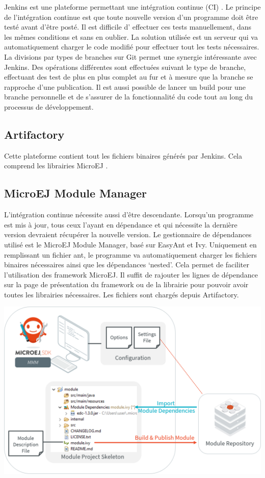 \documentclass[french,a4paper,12pt]{report}
\begin{document}
Jenkins est une plateforme permettant une intégration continue (CI) . Le principe de l’intégration continue est que toute nouvelle version d’un programme doit être testé avant d’être posté. Il est difficile d' effectuer ces tests manuellement, dans les mêmes conditions et sans en oublier. La solution utilisée est un serveur qui va automatiquement charger le code modifié pour effectuer tout les tests nécessaires. La divisions par types de branches sur Git permet une synergie intéressante avec Jenkins. Des opérations différentes sont effectuées suivant le type de branche, effectuant des test de plus en plus complet au fur et à mesure que la branche se rapproche d'une publication. Il est aussi possible de lancer un build pour une branche personnelle et de s’assurer de la fonctionnalité du code tout au long du processus de développement.

\subsection{Artifactory}

Cette plateforme contient tout les fichiers binaires générés par Jenkins. Cela comprend les librairies MicroEJ .

\subsection{MicroEJ Module Manager}
L’intégration continue nécessite aussi d'être descendante. Lorsqu'un programme est mis à jour, tous ceux l'ayant en dépendance et qui nécessite la dernière version devraient récupérer la nouvelle version.
Le gestionnaire de dépendances utilisé est le MicroEJ Module Manager, basé sur EasyAnt et Ivy. Uniquement en remplissant un fichier ant, le programme va automatiquement charger les fichiers binaires nécessaires ainsi que les dépendances ‘nested’. Cela permet de faciliter l’utilisation des framework MicroEJ. Il suffit de rajouter les lignes de dépendance sur la page de présentation du framework ou de la librairie pour pouvoir avoir toutes les librairies nécessaires. Les fichiers sont chargés depuis Artifactory.

\begin{center}
\includegraphics[width=.8\textwidth]{./ressources/schemas/mmm_flow.png}
\end{center}
\end{document}
